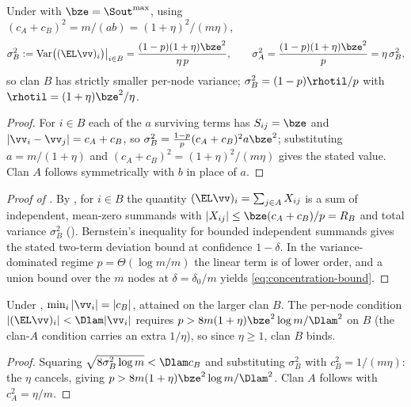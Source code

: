 \begin{proposition}\label{prop:C-var}
Under  with $\bze=\Sout^{\max}$, using
$(c_A+c_B)^2=m/(ab)=(1+\eta)^2/(m\eta)$,
\begin{equation}
   \sigma_B^2:=\operatorname{Var}\bigl((\EL\vv)_i\bigr)\big|_{i\in B}
   =\frac{(1-p)(1+\eta)\bze^2}{\eta\,p},
   \qquad
   \sigma_A^2=\frac{(1-p)(1+\eta)\bze^2}{p}=\eta\,\sigma_B^2,
\end{equation}
so clan $B$ has strictly smaller per-node variance;
$\sigma_B^2=(1-p)\rhotil/p$ with $\rhotil=(1+\eta)\bze^2/\eta$.
\end{proposition}
\begin{proof}
For $i\in B$ each of the $a$ surviving terms has $S_{ij}=\bze$ and
$|\vv_i-\vv_j|=c_A+c_B$, so $\sigma_B^2=\tfrac{1-p}{p}(c_A+c_B)^2a\bze^2$;
substituting $a=m/(1+\eta)$ and $(c_A+c_B)^2=(1+\eta)^2/(m\eta)$ gives the stated
value. Clan $A$ follows symmetrically with $b$ in place of $a$.
\end{proof}

\begin{proof}[Proof of ]
By , for $i\in B$ the quantity
$(\EL\vv)_i=\sum_{j\in A}X_{ij}$ is a sum of independent, mean-zero summands with
$|X_{ij}|\le\bze(c_A+c_B)/p=R_B$ and total variance $\sigma_B^2$
(). Bernstein's inequality for bounded independent summands gives
the stated two-term deviation bound at confidence $1-\delta$. In the
variance-dominated regime $p=\Theta(\log m/m)$ the linear term is of lower order,
and a union bound over the $m$ nodes at $\delta=\delta_0/m$ yields
\eqref{eq:concentration-bound}.
\end{proof}

\begin{proposition}\label{prop:C-bind}
Under , $\min_i|\vv_i|=|c_B|$, attained on the larger clan $B$. The
per-node condition $|(\EL\vv)_i|<\Dlam|\vv_i|$ requires
$p>8m(1+\eta)\bze^2\log m/\Dlam^2$ on $B$ (the clan-$A$ condition carries an extra
$1/\eta$), so since $\eta\ge1$, clan $B$ binds.
\end{proposition}
\begin{proof}
Squaring $\sqrt{8\sigma_B^2\log m}<\Dlam c_B$ and substituting $\sigma_B^2$ with
$c_B^2=1/(m\eta)$: the $\eta$ cancels, giving
$p>8m(1+\eta)\bze^2\log m/\Dlam^2$. Clan $A$ follows with $c_A^2=\eta/m$.
\end{proof}

